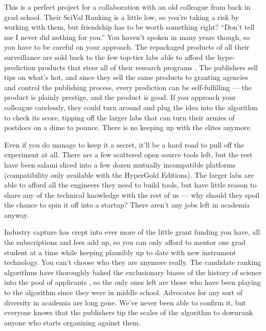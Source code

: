 \documentclass[10pt]{article}
\begin{document}
\begin{multicols}{2}
This is a perfect project for a collaboration with an old colleague from
back in grad school. Their SciVal Ranking is a little low, so you're
taking a risk by working with them, but friendship has to be worth
something right? ``Don't tell me I never did nothing for you.'' You
haven't spoken in many years though, so you have to be careful on your
approach. The repackaged products of all their surveillance are sold
back to the few top-tier labs able to afford the hype-prediction
products that steer all of their research programs \cite{lifesciencesprofessionalservicesEmergingTrendsPancreatitis2021, elsevierTopicProminenceScience} . The publishers sell tips on what's
hot, and since they sell the same products to granting agencies and
control the publishing process, every prediction can be self-fulfilling
--- the product is plainly prestige, and the product is good. If you
approach your colleague carelessly, they could turn around and plug the
idea into the algorithm to check its score, tipping off the larger labs
that can turn their armies of postdocs on a dime to pounce. There is no
keeping up with the elites anymore.

Even if you do manage to keep it a secret, it'll be a hard road to pull
off the experiment at all. There are a few scattered open source tools
left, but the rest have been salami sliced into a few dozen mutually
incompatible platforms (compatibility only available with the HyperGold
Editions). The larger labs are able to afford all the engineers they
need to build tools, but have little reason to share any of the
technical knowledge with the rest of us --- why should they spoil the
chance to spin it off into a startup? There aren't any jobs left in
academia anyway.

Industry capture has crept into ever more of the little grant funding
you have, all the subscriptions and fees add up, so you can only afford
to mentor one grad student at a time while keeping plausibly up to date
with new instrument technology. You can't choose who they are anymore
really. The candidate ranking algorithms have thoroughly baked the
exclusionary biases of the history of science into the pool of
applicants\cite{pooleySurveillancePublishing2021, brembsAlgorithmicEmploymentDecisions2021} , so the only ones left are
those who have been playing to the algorithm since they were in middle
school. Advocates for any sort of diversity in academia are long gone.
We've never been able to confirm it, but everyone knows that the
publishers tip the scales of the algorithm to downrank anyone who starts
organizing against them.


\end{multicols}
\end{document}
